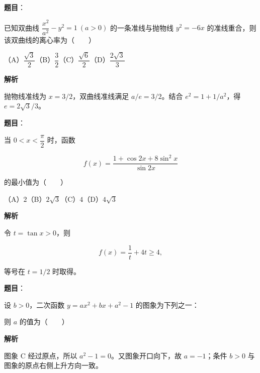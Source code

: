 \begin{answer}

\textbf{题目}：

已知双曲线 $\dfrac{x^2}{a^2}-y^2=1\ (a>0)$ 的一条准线与抛物线 $y^2=-6x$ 的准线重合，则该双曲线的离心率为\mbox{（　　）}

（A）$\dfrac{\sqrt3}{2}$\quad（B）$\dfrac32$\quad（C）$\dfrac{\sqrt6}{2}$\quad（D）$\dfrac{2\sqrt3}{3}$

\textbf{解析}

抛物线准线为 $x=3/2$，双曲线准线满足 $a/e=3/2$。结合 $e^2=1+1/a^2$，得 $e=2\sqrt3/3$。


\end{answer}
\begin{answer}

\textbf{题目}：

当 $0<x<\dfrac{\pi}{2}$ 时，函数

\nopagebreak[4]
\[
f(x)=\frac{1+\cos2x+8\sin^2x}{\sin2x}
\]

的最小值为\mbox{（　　）}

（A）$2$\quad（B）$2\sqrt3$\quad（C）$4$\quad（D）$4\sqrt3$

\textbf{解析}

令 $t=\tan x>0$，则

\nopagebreak[4]
\[
f(x)=\frac1t+4t\geqslant4,
\]

等号在 $t=1/2$ 时取得。


\end{answer}
\begin{answer}

\textbf{题目}：

设 $b>0$，二次函数 $y=ax^2+bx+a^2-1$ 的图象为下列之一：
\nopagebreak[4]
\begin{center}\end{center}
\nopagebreak[4]
则 $a$ 的值为\mbox{（　　）}

\textbf{解析}

图象 C 经过原点，所以 $a^2-1=0$。又图象开口向下，故 $a=-1$；条件 $b>0$ 与图象的原点右侧上升方向一致。


\end{answer}
